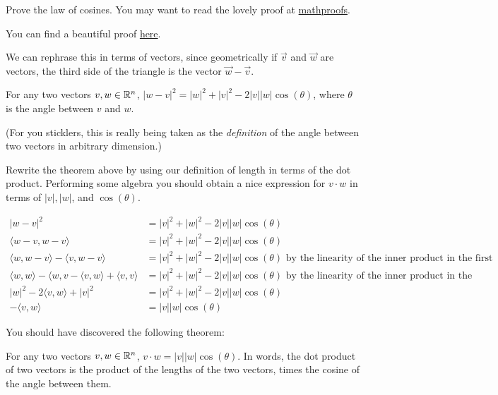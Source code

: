 \documentclass{ximera}
\begin{document}
Prove the law of cosines.  You may want to read the lovely proof at \href{http://mathproofs.blogspot.com/2006/06/law-of-cosines.html}{mathproofs}.
\begin{free-response}
  You can find a beautiful proof \href{http://mathproofs.blogspot.com/2006/06/law-of-cosines.html}{here}.
\end{free-response}

We can rephrase this in terms of vectors, since geometrically if $\vec{v}$ and $\vec{w}$ are vectors, the third side of the triangle is the vector $\vec{w}-\vec{v}$.


\begin{theorem}
  For any two vectors $v,w \in \mathbb R^n$, $|w-v|^2 = |w|^2 +|v|^2 - 2|v| |w| \cos(\theta) $, where $\theta$ is the angle between $v$ and $w$.
\end{theorem}

(For you sticklers, this is really being taken as the \textit{definition} of the angle between two vectors in arbitrary dimension.)

Rewrite the theorem above by using our definition of length in terms of the dot product.  Performing some algebra you should obtain a nice expression for $v\cdot w$ in terms of $|v|, |w|$, and $\cos(\theta)$.

\begin{free-response}
  \begin{align*}
    |w-v|^2 &= |v|^2+|w|^2 - 2|v||w|\cos(\theta)\\
    \langle w-v,w-v\rangle &= |v|^2+|w|^2- 2|v||w|\cos(\theta)\\
    \langle w,w-v\rangle-\langle v,w-v\rangle &= |v|^2+|w|^2- 2|v||w|\cos(\theta) \text{ by the linearity of the inner product in the first slot}\\
    \langle w,w\rangle - \langle{w,v} -\langle v,w \rangle + \langle v,v\rangle&= |v|^2+|w|^2- 2|v||w|\cos(\theta) \text{ by the linearity of the inner product in the second slot}\\
    |w|^2 - 2\langle v,w\rangle + |v|^2 &= |v|^2+|w|^2- 2|v||w|\cos(\theta)\\
    -\langle v,w\rangle &= |v||w|\cos(\theta)
  \end{align*}
\end{free-response} 

You should have discovered the following theorem:
 
\begin{theorem}
  For any two vectors $v,w \in \mathbb R^n$, $v \cdot w =
  |v||w|\cos(\theta)$.  In words, the dot product of two vectors is
  the product of the lengths of the two vectors, times the cosine of
  the angle between them.
\end{theorem}
 
\end{document}
